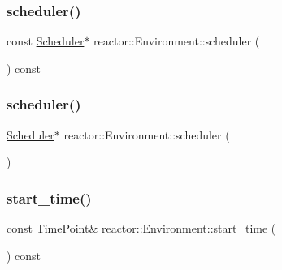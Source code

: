 \subsubsection{\texorpdfstring{scheduler()}{scheduler()}\hspace{0.1cm}{\footnotesize\ttfamily [1/2]}}
{\footnotesize\ttfamily const \hyperlink{classreactor_1_1Scheduler}{Scheduler}$\ast$ reactor\+::\+Environment\+::scheduler (\begin{DoxyParamCaption}{ }\end{DoxyParamCaption}) const\hspace{0.3cm}{\ttfamily [inline]}}

\mbox{\label{classreactor_1_1Environment_a4ac32b7f7f9a420bb689d7f5c5ce48da}} 
\subsubsection{\texorpdfstring{scheduler()}{scheduler()}\hspace{0.1cm}{\footnotesize\ttfamily [2/2]}}
{\footnotesize\ttfamily \hyperlink{classreactor_1_1Scheduler}{Scheduler}$\ast$ reactor\+::\+Environment\+::scheduler (\begin{DoxyParamCaption}{ }\end{DoxyParamCaption})\hspace{0.3cm}{\ttfamily [inline]}}

\mbox{\label{classreactor_1_1Environment_af7643c6bf796bd083ff4976af19e8838}} 
\subsubsection{\texorpdfstring{start\+\_\+time()}{start\_time()}}
{\footnotesize\ttfamily const \hyperlink{namespacereactor_ad950f8d1a46612500286a4af0f167080}{Time\+Point}\& reactor\+::\+Environment\+::start\+\_\+time (\begin{DoxyParamCaption}{ }\end{DoxyParamCaption}) const\hspace{0.3cm}{\ttfamily [inline]}}

